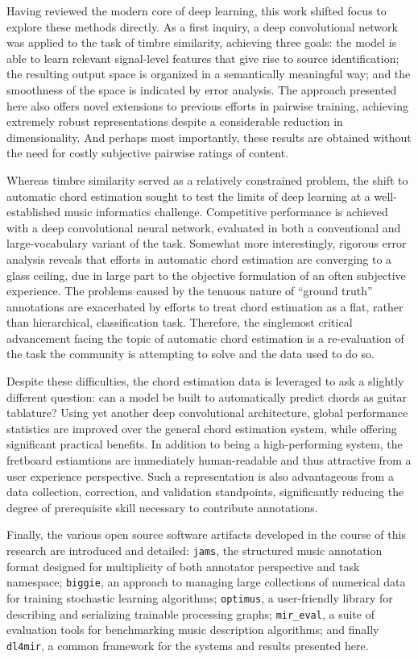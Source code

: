 Having reviewed the modern core of deep learning, this work shifted focus to explore these methods directly.
As a first inquiry, a deep convolutional network was applied to the task of timbre similarity, achieving three goals:
the model is able to learn relevant signal-level features that give rise to source identification;
the resulting output space is organized in a semantically meaningful way;
and the smoothness of the space is indicated by error analysis.
The approach presented here also offers novel extensions to previous efforts in pairwise training, achieving extremely robust representations despite a considerable reduction in dimensionality.
And perhaps most importantly, these results are obtained without the need for costly subjective pairwise ratings of content.

Whereas timbre similarity served as a relatively constrained problem, the shift to automatic chord estimation sought to test the limits of deep learning at a well-established music informatics challenge.
Competitive performance is achieved with a deep convolutional neural network, evaluated in both a conventional and large-vocabulary variant of the task.
Somewhat more interestingly, rigorous error analysis reveals that efforts in automatic chord estimation are converging to a glass ceiling, due in large part to the objective formulation of an often subjective experience.
The problems caused by the tenuous nature of ``ground truth'' annotations are exacerbated by efforts to treat chord estimation as a flat, rather than hierarchical, classification task.
Therefore, the singlemost critical advancement facing the topic of automatic chord estimation is a re-evaluation of the task the community is attempting to solve and the data used to do so.

Despite these difficulties, the chord estimation data is leveraged to ask a slightly different question: can a model be built to automatically predict chords as guitar tablature?
Using yet another deep convolutional architecture, global performance statistics are improved over the general chord estimation system, while offering significant practical benefits.
In addition to being a high-performing system, the fretboard estiamtions are immediately human-readable and thus attractive from a user experience perspective.
Such a representation is also advantageous from a data collection, correction, and validation standpoints, significantly reducing the degree of prerequisite skill necessary to contribute annotations.

Finally, the various open source software artifacts developed in the course of this research are introduced and detailed:
\texttt{jams}, the structured music annotation format designed for multiplicity of both annotator perspective and task namespace;
\texttt{biggie}, an approach to managing large collections of numerical data for training stochastic learning algorithms;
\texttt{optimus}, a user-friendly library for describing and serializing trainable processing graphs;
\texttt{mir\_eval}, a suite of evaluation tools for benchmarking music description algorithms;
and finally \texttt{dl4mir}, a common framework for the systems and results presented here.


